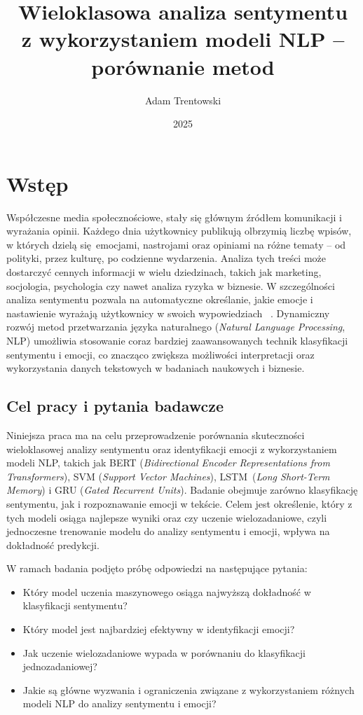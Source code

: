 \documentclass[wmii, inf, mgr]{uwmthesis}
\date{2025}
\title{Wieloklasowa analiza sentymentu\\z wykorzystaniem modeli NLP --\\ porównanie metod}
\author{Adam Trentowski}
\begin{document}
\maketitle

\tableofcontents

\chapter*{Wstęp}
Współczesne media społecznościowe, stały się głównym źródłem komunikacji i wyrażania opinii. Każdego dnia użytkownicy publikują olbrzymią liczbę wpisów, w których dzielą się~emocjami, nastrojami oraz opiniami na różne tematy – od polityki, przez kulturę, po codzienne wydarzenia. Analiza tych treści może dostarczyć cennych informacji w wielu dziedzinach, takich jak marketing, socjologia, psychologia czy nawet analiza ryzyka w biznesie. W szczególności analiza sentymentu pozwala na automatyczne określanie, jakie emocje i nastawienie wyrażają użytkownicy w swoich wypowiedziach ~\cite{Liu2012}. Dynamiczny rozwój metod przetwarzania języka naturalnego (\textit{Natural Language Processing}, NLP) umożliwia stosowanie coraz bardziej zaawansowanych technik klasyfikacji sentymentu i emocji, co znacząco zwiększa możliwości interpretacji oraz wykorzystania danych tekstowych w badaniach naukowych i biznesie.

\section*{Cel pracy i pytania badawcze}
Niniejsza praca ma na celu przeprowadzenie porównania skuteczności wieloklasowej analizy sentymentu oraz identyfikacji emocji z wykorzystaniem modeli NLP, takich jak BERT (\textit{Bidirectional Encoder
Representations from Transformers}), SVM (\textit{Support Vector Machines}), LSTM~(\textit{Long Short-Term Memory}) i GRU (\textit{Gated Recurrent Units}). Badanie obejmuje zarówno klasyfikację sentymentu, jak i rozpoznawanie emocji w tekście. Celem jest określenie, który z tych modeli osiąga najlepsze wyniki oraz czy uczenie wielozadaniowe, czyli jednoczesne trenowanie modelu do analizy sentymentu i emocji, wpływa na dokładność predykcji.

W ramach badania podjęto próbę odpowiedzi na następujące pytania:
\begin{itemize}
    \item Który model uczenia maszynowego osiąga najwyższą dokładność w klasyfikacji sentymentu?
    \item Który model jest najbardziej efektywny w identyfikacji emocji?
    \item Jak uczenie wielozadaniowe wypada w porównaniu do klasyfikacji jednozadaniowej?
    \item Jakie są główne wyzwania i ograniczenia związane z wykorzystaniem różnych modeli NLP do analizy sentymentu i emocji?
\end{itemize}
\end{document}
